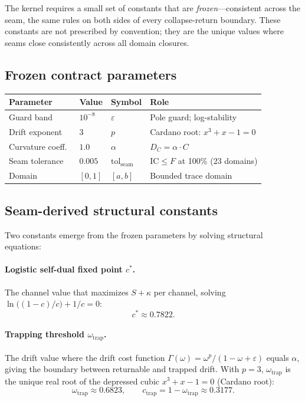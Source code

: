 \documentclass[
  aps,
  prd,
  preprint,
  superscriptaddress,
  nofootinbib,
  floatfix
]{revtex4-2}
\newcommand{\tolseam}{\mathrm{tol}_{\mathrm{seam}}}
\newcommand{\IC}{\mathrm{IC}}
\begin{document}
The kernel requires a small set of constants that are \emph{frozen}---consistent across the seam, the same rules on both
sides of every collapse-return boundary. These constants are not prescribed by convention; they are the unique values
where seams close consistently across all domain closures.

\subsection{Frozen contract parameters}
\begin{center}
\small
\begin{tabular}{@{}llll@{}}
\toprule
Parameter & Value & Symbol & Role \\
\midrule
Guard band & $10^{-8}$ & $\varepsilon$ & Pole guard; log-stability \\
Drift exponent & $3$ & $p$ & Cardano root: $x^3{+}x{-}1{=}0$ \\
Curvature coeff.\ & $1.0$ & $\alpha$ & $D_C = \alpha\cdot C$ \\
Seam tolerance & $0.005$ & $\tolseam$ & $\IC{\le}F$ at 100\% (23 domains) \\
Domain & $[0,1]$ & $[a,b]$ & Bounded trace domain \\
\bottomrule
\end{tabular}
\end{center}

\subsection{Seam-derived structural constants}
Two constants emerge from the frozen parameters by solving structural equations:

\paragraph{Logistic self-dual fixed point $c^*$.}
The channel value that maximizes $S+\kappa$ per channel, solving $\ln\!\bigl((1-c)/c\bigr)+1/c=0$:
\begin{equation}
  c^* \approx 0.7822.
\end{equation}

\paragraph{Trapping threshold $\omega_{\mathrm{trap}}$.}
The drift value where the drift cost function $\Gamma(\omega)=\omega^p/(1-\omega+\varepsilon)$ equals $\alpha$, giving the boundary
between returnable and trapped drift. With $p=3$, $\omega_{\mathrm{trap}}$ is the unique real root of the depressed cubic
$x^3+x-1=0$ (Cardano root):
\begin{equation}
  \omega_{\mathrm{trap}} \approx 0.6823, \qquad c_{\mathrm{trap}} = 1-\omega_{\mathrm{trap}} \approx 0.3177.
\end{equation}
\end{document}
